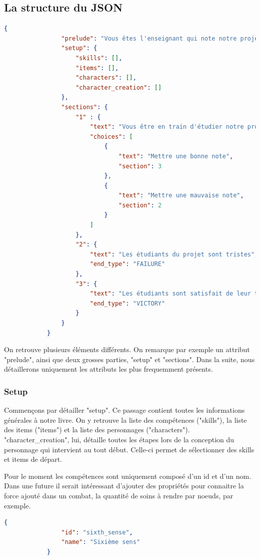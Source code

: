 		\subsection{La structure du JSON}

			\begin{lstlisting}[gobble=12, language=json, caption=Exemple de livre très simple, label=lst:exemple_livre]
			{
				"prelude": "Vous êtes l'enseignant qui note notre projet",
				"setup": {
					"skills": [],
					"items": [],
					"characters": [],
					"character_creation": []
				},
				"sections": {
					"1" : {
						"text": "Vous être en train d'étudier notre projet",
						"choices": [
							{
								"text": "Mettre une bonne note",
								"section": 3
							},
							{
								"text": "Mettre une mauvaise note",
								"section": 2
							}
						]
					},
					"2": {
						"text": "Les étudiants du projet sont tristes",
						"end_type": "FAILURE"
					},
					"3": {
						"text": "Les étudiants sont satisfait de leur travail",
						"end_type": "VICTORY"
					}
				}
			}
			\end{lstlisting}

		On retrouve plusieurs éléments différents. On remarque par exemple un attribut "prelude", ainsi que deux grosses parties, "setup" et "sections". Dans la suite, nous détaillerons uniquement les attributs les plus frequemment présents.

		\subsubsection{Setup}

			Commençons par détailler "setup". Ce passage contient toutes les informations générales à notre livre. On y retrouve la liste des compétences ("skills"), la liste des items ("items") et la liste des personnages ("characters"). "character\_creation", lui, détaille toutes les étapes lors de la conception du personnage qui intervient au tout début. Celle-ci permet de sélectionner des skills et items de départ.

			Pour le moment les compétences sont uniquement composé d'un id et d'un nom. Dans une future \maj{} il serait intéressant d'ajouter des propriétés pour connaitre la force ajouté dans un combat, la quantité de soins à rendre par noeuds, par exemple.

			\begin{lstlisting}[gobble=12, language=json, caption=Exemple de compétence]
			{
				"id": "sixth_sense",
				"name": "Sixième sens"
			}
			\end{lstlisting}

